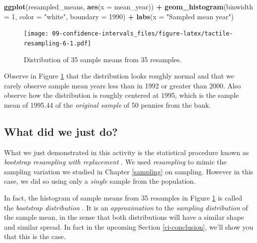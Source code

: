 \documentclass[
]{book}
\newenvironment{Shaded}{\begin{snugshade}}{\end{snugshade}}
\newcommand{\DataTypeTok}[1]{\textcolor[rgb]{0.13,0.29,0.53}{#1}}
\newcommand{\DecValTok}[1]{\textcolor[rgb]{0.00,0.00,0.81}{#1}}
\newcommand{\KeywordTok}[1]{\textcolor[rgb]{0.13,0.29,0.53}{\textbf{#1}}}
\newcommand{\NormalTok}[1]{#1}
\newcommand{\OperatorTok}[1]{\textcolor[rgb]{0.81,0.36,0.00}{\textbf{#1}}}
\newcommand{\StringTok}[1]{\textcolor[rgb]{0.31,0.60,0.02}{#1}}
\begin{document}
\begin{Shaded}
\begin{Highlighting}[]
\KeywordTok{ggplot}\NormalTok{(resampled_means, }\KeywordTok{aes}\NormalTok{(}\DataTypeTok{x =}\NormalTok{ mean_year)) }\OperatorTok{+}
\StringTok{  }\KeywordTok{geom_histogram}\NormalTok{(}\DataTypeTok{binwidth =} \DecValTok{1}\NormalTok{, }\DataTypeTok{color =} \StringTok{"white"}\NormalTok{, }\DataTypeTok{boundary =} \DecValTok{1990}\NormalTok{) }\OperatorTok{+}
\StringTok{  }\KeywordTok{labs}\NormalTok{(}\DataTypeTok{x =} \StringTok{"Sampled mean year"}\NormalTok{)}
\end{Highlighting}
\end{Shaded}

\begin{figure}
\centering
\texttt{[image: 09-confidence-intervals\_files/figure-latex/tactile-resampling-6-1.pdf]}
\caption{\label{fig:tactile-resampling-6}Distribution of 35 sample means from 35 resamples.}
\end{figure}

Observe in Figure \ref{fig:tactile-resampling-6} that the distribution looks roughly normal and that we rarely observe sample mean years less than in 1992 or greater than 2000. Also observe how the distribution is roughly centered at 1995, which is the sample mean of 1995.44 of the \emph{original sample} of 50 pennies from the bank.

\hypertarget{what-did-we-just-do}{%
\subsection{What did we just do?}\label{what-did-we-just-do}}

What we just demonstrated in this activity is the statistical procedure known as \emph{bootstrap resampling with replacement} . We used \emph{resampling} to mimic the sampling variation we studied in Chapter \ref{sampling} on sampling. However in this case, we did so using only a \emph{single} sample from the population.

In fact, the histogram of sample means from 35 resamples in Figure \ref{fig:tactile-resampling-6} is called the \emph{bootstrap distribution} . It is an \emph{approximation} to the \emph{sampling distribution} of the sample mean, in the sense that both distributions will have a similar shape and similar spread. In fact in the upcoming Section \ref{ci-conclusion}, we'll show you that this is the case.
\end{document}
